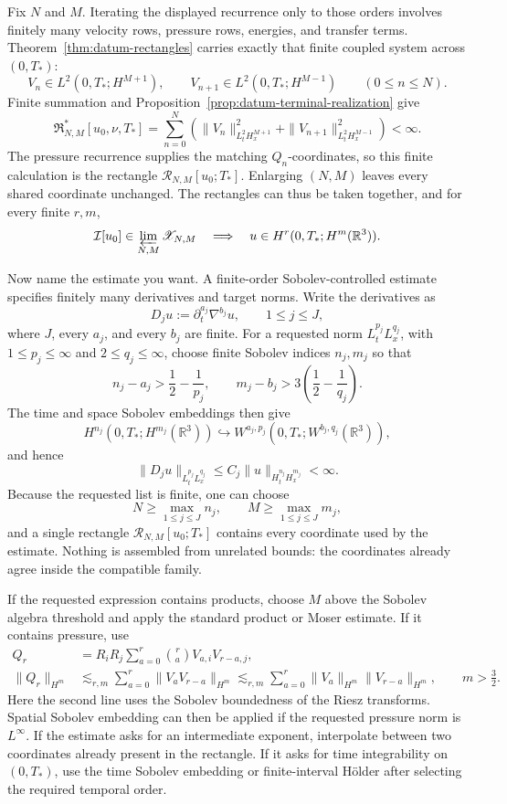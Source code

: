 Fix \(N\) and \(M\).  Iterating the displayed recurrence only to those orders
involves finitely many velocity rows, pressure rows, energies, and transfer
terms.  Theorem~\ref{thm:datum-rectangles} carries exactly that finite coupled
system across \((0,T_*)\):
\[
V_n\in L^2(0,T_*;H^{M+1}),
\qquad
V_{n+1}\in L^2(0,T_*;H^{M-1})
\qquad(0\le n\le N).
\]
Finite summation and Proposition~\ref{prop:datum-terminal-realization} give
\[
\mathfrak R^*_{N,M}[u_0,\nu,T_*]
=\sum_{n=0}^{N}
\left(
\|V_n\|_{L^2_tH^{M+1}_x}^2
+\|V_{n+1}\|_{L^2_tH^{M-1}_x}^2
\right)<\infty.
\]
The pressure recurrence supplies the matching \(Q_n\)-coordinates, so this
finite calculation is the rectangle \(\mathcal R_{N,M}[u_0;T_*]\).  Enlarging
\((N,M)\) leaves every shared coordinate unchanged.  The rectangles can thus
be taken together, and for every finite \(r,m\),
\[
\mathcal I[u_0]
\in\varprojlim_{N,M}\mathscr X_{N,M}
\quad\Longrightarrow\quad
u\in H^r(0,T_*;H^m(\mathbb R^3)).
\]

\clearpage

Now name the estimate you want.  A finite-order Sobolev-controlled estimate
specifies finitely many derivatives and target norms.  Write the derivatives as
\[
D_j u:=\partial_t^{a_j}\nabla^{b_j}u,
\qquad 1\le j\le J,
\]
where \(J\), every \(a_j\), and every \(b_j\) are finite.  For a requested norm
\(L_t^{p_j}L_x^{q_j}\), with \(1\le p_j\le\infty\) and
\(2\le q_j\le\infty\), choose finite Sobolev indices \(n_j,m_j\) so that
\[
n_j-a_j>\frac12-\frac1{p_j},
\qquad
m_j-b_j>3\!\left(\frac12-\frac1{q_j}\right).
\]
The time and space Sobolev embeddings then give
\[
H^{n_j}(0,T_*;H^{m_j}(\mathbb R^3))
\hookrightarrow
W^{a_j,p_j}(0,T_*;W^{b_j,q_j}(\mathbb R^3)),
\]
and hence
\[
\|D_j u\|_{L_t^{p_j}L_x^{q_j}}
\le
C_j\|u\|_{H_t^{n_j}H_x^{m_j}}<\infty.
\]
Because the requested list is finite, one can choose
\[
N\ge\max_{1\le j\le J}n_j,
\qquad
M\ge\max_{1\le j\le J}m_j,
\]
and a single rectangle \(\mathcal R_{N,M}[u_0;T_*]\) contains every coordinate
used by the estimate.  Nothing is assembled from unrelated bounds: the
coordinates already agree inside the compatible family.

If the requested expression contains products, choose \(M\) above the
Sobolev algebra threshold and apply the standard product or Moser estimate.
If it contains pressure, use
\[
\begin{aligned}
Q_r
&=R_iR_j\sum_{a=0}^{r}\binom ra V_{a,i}V_{r-a,j},\\
\|Q_r\|_{H^m}
&\lesssim_{r,m}
\sum_{a=0}^{r}\|V_aV_{r-a}\|_{H^m}
\lesssim_{r,m}
\sum_{a=0}^{r}\|V_a\|_{H^m}\|V_{r-a}\|_{H^m},
\qquad m>\frac32.
\end{aligned}
\]
Here the second line uses the Sobolev boundedness of the Riesz transforms.
Spatial Sobolev embedding can then be applied if the requested pressure norm
is \(L^\infty\).  If the estimate asks for an intermediate exponent,
interpolate between two coordinates already present in the rectangle.  If it
asks for time integrability on \((0,T_*)\), use the time Sobolev embedding or
finite-interval H\"older after selecting the required temporal order.

